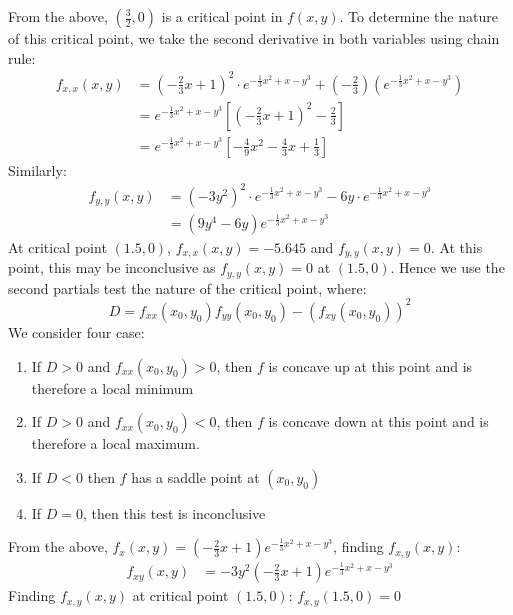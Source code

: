 \documentclass{article}
\begin{document}
\begin{enumerate}
\begin{enumerate}
			From the above, $(\frac{3}{2}, 0)$ is a critical point in $f(x,y)$. To determine the nature of this critical point, we take the second derivative in both variables using chain rule:
			\begin{equation*}
				\begin{split}
					f_{x,x}(x,y) &= \left(-\frac{2}{3}x+1\right)^2\cdot e^{-\frac{1}{3}x^2 + x - y^3} + \left(-\frac{2}{3}\right) \left(e^{-\frac{1}{3}x^2 + x - y^3}\right)\\
					&= e^{-\frac{1}{3}x^2 + x - y^3}\left[\left(-\frac{2}{3}x+1\right)^2 -\frac{2}{3}\right]\\
					&= e^{-\frac{1}{3}x^2 + x - y^3}\left[-\frac{4}{9}x^2 -\frac{4}{3}x + \frac{1}{3}\right]
				\end{split}
			\end{equation*}
			Similarly:
			\begin{equation*}
				\begin{split}
					f_{y,y}(x,y) &= (-3y^2)^2\cdot e^{-\frac{1}{3}x^2 + x - y^3} - 6y\cdot e^{-\frac{1}{3}x^2 + x - y^3}\\
					&= (9y^4 - 6y)e^{-\frac{1}{3}x^2 + x - y^3}
				\end{split}
			\end{equation*}
			At critical point $(1.5, 0)$, $f_{x,x}(x,y) = -5.645$ and $f_{y,y}(x,y) = 0$. At this point, this may be inconclusive as $f_{y,y}(x,y) = 0$ at $(1.5, 0)$. Hence we use the second partials test the nature of the critical point, where:
			\begin{equation*}
				D = f_{xx} (x_{0}, y_0 )f_{yy} (x_{0}, y_{0}) - (f_{xy}(x_{0}, y_{0}))^2
			\end{equation*}
			We consider four case:
			\begin{enumerate}
				\item If $D>0$ and $f_{xx}(x_{0}, y_{0}) > 0$, then $f$ is concave up at this point and is therefore a local minimum
				\item If $D>0$ and $f_{xx}(x_{0}, y_{0}) < 0$, then $f$ is concave down at this point and is therefore a local maximum.
				\item If $D < 0$ then $f$ has a saddle point at $(x_0, y_0)$
				\item If $D=0$, then this test is inconclusive
			\end{enumerate}
			From the above, $f_{x}(x,y) = \left(-\frac{2}{3}x + 1\right)e^{-\frac{1}{3}x^2 + x - y^3}$, finding $f_{x,y}(x,y)$:
			\begin{equation*}
				\begin{split}
					f_{xy}(x,y) &= -3y^{2}\left(-\frac{2}{3}x + 1\right)e^{-\frac{1}{3}x^2 + x - y^3}
				\end{split}
			\end{equation*}
			Finding $f_{x,y}(x,y)$ at critical point $(1.5, 0)$:
			$f_{x,y}(1.5, 0) = 0$
			

\end{enumerate}
\end{enumerate}
\end{document}
